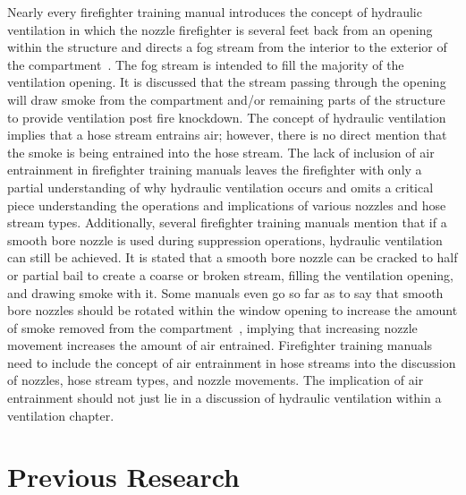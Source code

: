 \documentclass[12pt,oneside]{book}
\begin{document}
Nearly every firefighter training manual introduces the concept of hydraulic ventilation in which the nozzle firefighter is several feet back from an opening within the structure and directs a fog stream from the interior to the exterior of the compartment~\cite{Essentials6,FEHandbook}. The fog stream is intended to fill the majority of the ventilation opening. It is discussed that the stream passing through the opening will draw smoke from the compartment and/or remaining parts of the structure to provide ventilation post fire knockdown. The concept of hydraulic ventilation implies that a hose stream entrains air; however, there is no direct mention that the smoke is being entrained into the hose stream. The lack of inclusion of air entrainment in firefighter training manuals leaves the firefighter with only a partial understanding of why hydraulic ventilation occurs and omits a critical piece understanding the operations and implications of various nozzles and hose stream types. Additionally, several firefighter training manuals mention that if a smooth bore nozzle is used during suppression operations, hydraulic ventilation can still be achieved. It is stated that a smooth bore nozzle can be cracked to half or partial bail to create a coarse or broken stream, filling the ventilation opening, and drawing smoke with it. Some manuals even go so far as to say that smooth bore nozzles should be rotated within the window opening to increase the amount of smoke removed from the compartment~\cite{FEHandbook}, implying that increasing nozzle movement increases the amount of air entrained. Firefighter training manuals need to include the concept of air entrainment in hose streams into the discussion of nozzles, hose stream types, and nozzle movements. The implication of air entrainment should not just lie in a discussion of hydraulic ventilation within a ventilation chapter.

\section{Previous Research}
\end{document}
